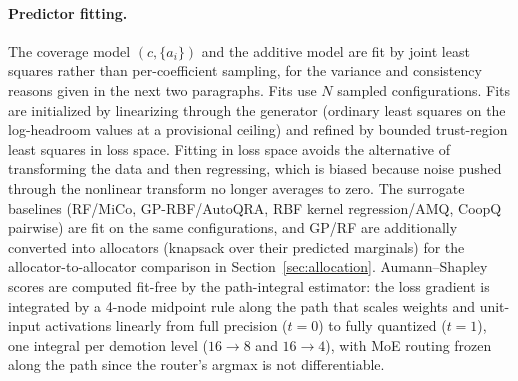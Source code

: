 \paragraph{Predictor fitting.} The coverage model $(c, \{a_i\})$ and the additive model are fit by joint
least squares rather than per-coefficient sampling, for the variance and consistency reasons given in
the next two paragraphs. Fits use $N$
sampled configurations. Fits are initialized by linearizing through the generator
(ordinary least squares on the log-headroom values at a provisional ceiling) and refined by bounded
trust-region least squares in loss
space. Fitting in loss space avoids the alternative of transforming the data and then regressing, which
is biased because noise pushed through the nonlinear transform no longer averages to zero.
The surrogate baselines (RF/MiCo, GP-RBF/AutoQRA, RBF kernel
regression/AMQ, CoopQ pairwise) are fit on the same configurations, and GP/RF are
additionally converted into allocators (knapsack over their predicted marginals) for the
allocator-to-allocator comparison in Section~\ref{sec:allocation}. Aumann--Shapley scores are computed fit-free
by the path-integral estimator: the loss gradient is integrated by a 4-node midpoint rule along the
path that scales weights and unit-input activations linearly from full precision ($t=0$) to fully
quantized ($t=1$), one integral per demotion level ($16\to 8$ and $16\to 4$), with MoE routing frozen
along the path since the router's argmax is not differentiable. 

